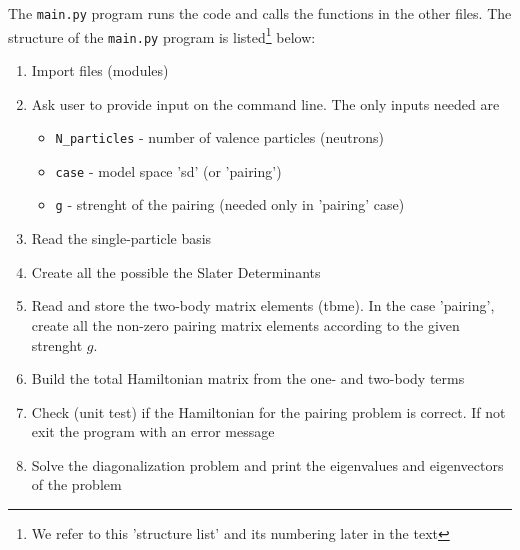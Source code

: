 \documentclass[twoside]{article}
\begin{document}
The \texttt{main.py} program runs the code and calls the functions in the other files. The structure of the \texttt{main.py} program is listed\footnote{We refer to this 'structure list' and its numbering later in the text} below:

\begin{tcolorbox}
\begin{enumerate}
\item Import files (modules)
\item Ask user to provide input on the command line. The only inputs needed are \label{list: user_input}
\begin{itemize}
\item \texttt{N\_particles} - number of valence particles (neutrons) 
\item \texttt{case} - model space 'sd' (or 'pairing')
\item \texttt{g} - strenght of the pairing (needed only in 'pairing' case)
\end{itemize}
\item Read the single-particle basis \label{list: sp}
\item Create all the possible the Slater Determinants \label{list: SD}
\item Read and store the two-body matrix elements (tbme). In the case 'pairing', create all the non-zero pairing matrix elements according to the given strenght $g$. \label{list: tbme}
\item Build the total Hamiltonian matrix from the one- and two-body terms \label{list: build_ham}
\item Check (unit test) if the Hamiltonian for the pairing problem is correct. If not exit the program with an error message \label{list: unit_test}
\item Solve the diagonalization problem and print the eigenvalues and eigenvectors of the problem \label{list: diag_eigval_vec}
\end{enumerate}
\end{tcolorbox}


\smallskip
\end{document}
